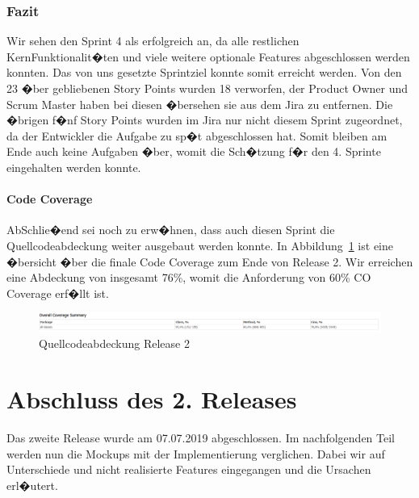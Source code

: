 \documentclass[12pt, titlepage]{scrartcl}
\newcommand{\Abb}[1]{%
	Abbildung\ \ref{#1}%
}
\begin{document}
			\subsubsection{Fazit}
			Wir sehen den Sprint 4 als erfolgreich an, da alle restlichen KernFunktionalit�ten und viele weitere optionale Features abgeschlossen werden konnten. Das von uns gesetzte Sprintziel konnte somit erreicht werden. Von den 23 �ber gebliebenen Story Points wurden 18 verworfen, der Product Owner und Scrum Master haben bei diesen �bersehen sie aus dem Jira zu entfernen. Die �brigen f�nf Story Points wurden im Jira nur nicht diesem Sprint zugeordnet, da der Entwickler die Aufgabe zu sp�t abgeschlossen hat. Somit bleiben am Ende auch keine Aufgaben �ber, womit die Sch�tzung f�r den 4. Sprinte eingehalten werden konnte.
			
			\paragraph{Code Coverage}
			AbSchlie�end sei noch zu erw�hnen, dass auch diesen Sprint die Quellcodeabdeckung weiter ausgebaut werden konnte. In \Abb{CodeCoverageReleaseTwo} ist eine �bersicht �ber die finale Code Coverage zum Ende von Release 2. Wir erreichen eine Abdeckung von insgesamt 76\%, womit die Anforderung von 60\% CO Coverage erf�llt ist.
			
			\begin{figure}[H] 
				\centering
				\includegraphics[width=1\textwidth]{Coverage_Sprint_4.PNG}
				\caption{Quellcodeabdeckung Release 2}
				\label{CodeCoverageReleaseTwo}
			\end{figure}
			
			\section{Abschluss des 2. Releases}
			Das zweite Release wurde am 07.07.2019 abgeschlossen. Im nachfolgenden Teil werden nun die Mockups mit der Implementierung verglichen. Dabei wir auf Unterschiede und nicht realisierte Features eingegangen und die Ursachen erl�utert.
			
\end{document}
